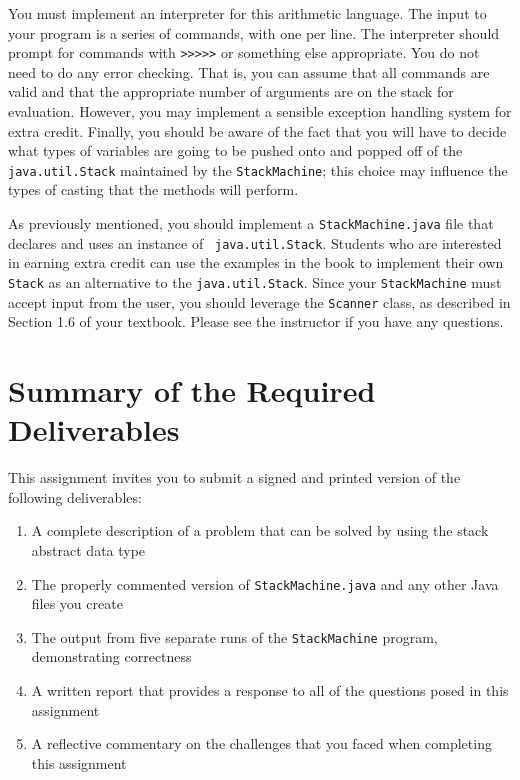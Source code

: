 You must implement an interpreter for this arithmetic language. The input to your program is a series of commands, with
one per line. The interpreter should prompt for commands with
\texttt{\textgreater{}\textgreater{}\textgreater{}\textgreater{}\textgreater{}} or something else appropriate. You do
not need to do any error checking.  That is, you can assume that all commands are valid and that the appropriate number
of arguments are on the stack for evaluation. However, you may implement a sensible exception handling system for
extra credit.  Finally, you should be aware of the fact that you will have to decide what types of variables are going
to be pushed onto and popped off of the {\tt java.util.Stack} maintained by the \texttt{StackMachine}; this choice may
influence the types of casting that the methods will perform.

As previously mentioned, you should implement a {\tt StackMachine.java} file that declares and uses an instance of {\tt
java.util.Stack}. Students who are interested in earning extra credit can use the examples in the book to implement
their own {\tt Stack} as an alternative to the {\tt java.util.Stack}.  Since your {\tt StackMachine} must accept input
from the user, you should leverage the {\tt Scanner} class, as described in Section 1.6 of your textbook. Please see the
instructor if you have any questions.

\section*{Summary of the Required Deliverables}

This assignment invites you to submit a signed and printed version of the following deliverables:

\begin{enumerate}
  \itemsep0pt

  \item A complete description of a problem that can be solved by using the stack abstract data type

  \item The properly commented version of {\tt StackMachine.java} and any other Java files you create

  \item The output from five separate runs of the {\tt StackMachine} program, demonstrating correctness

  \item A written report that provides a response to all of the questions posed in this assignment

  \item A reflective commentary on the challenges that you faced when completing this assignment

\end{enumerate}

